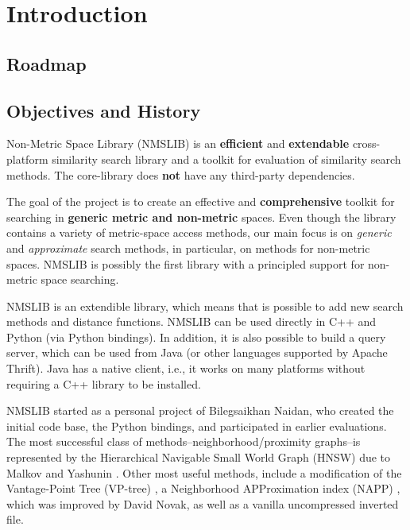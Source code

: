 
\section{Introduction}
\subsection{Roadmap}


\subsection{Objectives and History}

Non-Metric Space Library (NMSLIB) is an \textbf{efficient} and \textbf{extendable} cross-platform similarity search library and a toolkit for evaluation of similarity search methods.  The core-library does \textbf{not} have any third-party dependencies.

The goal of the project is to create an effective and \textbf{comprehensive} toolkit for searching in \textbf{generic metric and non-metric} spaces.
Even though the library contains a variety of metric-space access methods,
our main focus is on \emph{generic} and \emph{approximate} search methods,
in particular, on methods for non-metric spaces.
NMSLIB is possibly the first library with a principled support for non-metric space searching.

NMSLIB is an extendible library, which means that is possible to add new search methods and distance functions. NMSLIB can be used directly in C++ and Python (via Python bindings). In addition, it is also possible to build a query server, which can be used from Java (or other languages supported by Apache Thrift). Java has a native client, i.e., it works on many platforms without requiring a C++ library to be installed.

NMSLIB started as a personal project of Bilegsaikhan Naidan, who created the initial code base, the Python bindings,
and participated in earlier evaluations. 
The most successful class of methods--neighborhood/proximity graphs--is represented by the Hierarchical Navigable Small World Graph (HNSW)
due to Malkov and Yashunin \cite{Malkov2016}. 
Other most useful methods, include a modification of the Vantage-Point Tree (VP-tree) \cite{Boytsov_and_Bilegsaikhan:nips2013},
a Neighborhood APProximation index (NAPP) \cite{tellez2013succinct},
which was improved by David Novak,
as well as a vanilla uncompressed inverted file. 

